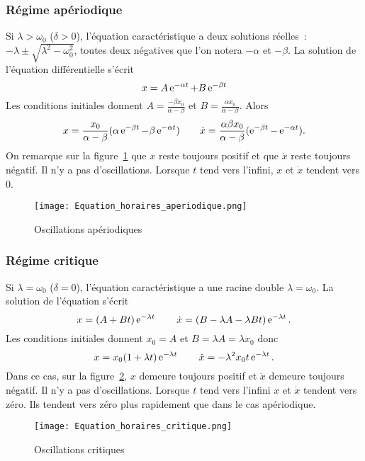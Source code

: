 \subsubsection{Régime apériodique}%
\label{chap5-subsubsec:aperiodique}%
%
Si \(\lambda>\omega_0\) (\(\delta>0\)), l'équation caractéristique a deux
solutions réelles~: \(-\lambda \pm \sqrt{\lambda^2-\omega_0^2}\), toutes deux
négatives que l'on notera \(-\alpha\) et \(-\beta\). La solution de l'équation
différentielle s'écrit
\begin{equation}%
  x = A\e^{-\alpha t} +B\e^{-\beta t}
\end{equation}%
Les conditions initiales donnent \(A=\frac{-\beta x_0}{\alpha-\beta}\) et
\(B=\frac{\alpha x_0}{\alpha-\beta}\). Alors
\begin{equation}%
  x = \frac{x_0}{\alpha - \beta}(\alpha \e^{-\beta t} - \beta \e^{-\alpha t})
  \qquad \dot x = \frac{\alpha \beta x_0}{\alpha - \beta}(\e^{-\beta t} -
  \e^{-\alpha t}).
\end{equation}%
On remarque sur la figure~\ref{fig:osc_aperiodique} que \(x\) reste
toujours positif et que \(\dot x\) reste toujours négatif.
Il n'y a pas d'oscillations. Lorsque \(t\) tend vers l'infini, \(x\)
et \(\dot x\) tendent vers \(0\).

\begin{figure}%
  \centering
  \texttt{[image: Equation\_horaires\_aperiodique.png]}%
  \caption{Oscillations apériodiques}
  \label{fig:osc_aperiodique}
\end{figure}
%
\subsubsection{Régime critique}%
\label{chap5-subsubsec:critique}%
%
Si \(\lambda = \omega_0\) (\(\delta=0\)), l'équation caractéristique a une
racine double \(\lambda=\omega_0\). La solution de l'équation s'écrit
\begin{equation}%
  x = (A+Bt)\e^{-\lambda t} \qquad \dot x = (B-\lambda A-\lambda B
  t)\e^{-\lambda t}.
\end{equation}%
Les conditions initiales donnent \(x_0=A\) et \(B=\lambda A=\lambda x_0\) donc
\begin{equation}%
  x = x_0(1+\lambda t)\e^{-\lambda t} \qquad \dot x = -\lambda^2 x_0 t
  \e^{-\lambda t}.
\end{equation}%
%
Dans ce cas, sur la figure~\ref{fig:osc_critique}, \(x\) demeure
toujours positif et \(\dot x\) demeure toujours
négatif. Il n'y a pas d'oscillations. Lorsque \(t\) tend vers l'infini \(x\) et
\(\dot x\) tendent vers zéro. Ils tendent vers zéro plus rapidement que dans le
cas apériodique.
%
\begin{figure}%
  \centering
  \texttt{[image: Equation\_horaires\_critique.png]}%
  \caption{Oscillations critiques}
  \label{fig:osc_critique}
\end{figure}
